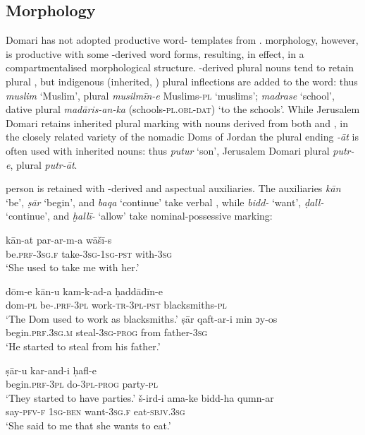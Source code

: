 \documentclass[output=paper]{langsci/langscibook}
\begin{document}
\subsection{Morphology}

Domari has not adopted productive word- templates from .   morphology, however, is productive with some -derived word forms, resulting, in effect, in a compartmentalised morphological structure. -derived plural nouns tend to retain  plural , but indigenous (inherited, ) plural inflections are added to the word: thus \textit{muslim} ‘Muslim’, plural \textit{musilmīn-e} Muslims-\textsc{pl} \textsc{‘}muslims’; \textit{madrase} ‘school’, dative plural \textit{madāris-an-ka}  (schools-\textsc{pl.obl-dat}) ‘to the schools’. While Jerusalem Domari retains inherited plural marking with nouns derived from both  and , in the closely related variety of the nomadic Doms of Jordan the  plural ending \textit{-āt} is often used with inherited nouns: thus \textit{putur} ‘son’, Jerusalem Domari plural \textit{putr-e},  plural \textit{putr-āt}.

 person   is retained with -derived  and aspectual auxiliaries. The auxiliaries \textit{kān} ‘be’, \textit{ṣār} ‘begin’, and \textit{baqa} ‘continue’ take  verbal , while \textit{bidd-} ‘want’, \textit{ḍall-} ‘continue’, and \textit{ḫallī-} ‘allow’ take  nominal-possessive marking:

\ea
\ea
\gll kān-at           par-ar-m-a        wāšī-s  \\
     be.\textsc{prf-3sg.f}   take-\textsc{3sg-1sg-pst}  with-\textsc{3sg}\\
\glt ‘She used to take me with her.’

\ex
\gll dōm-e kān-u kam-k-ad-a  {ḥ}addādīn-e\\
     dom-\textsc{pl} be-\textsc{.prf-3pl} work-\textsc{tr-3pl-pst} blacksmiths-\textsc{pl}\\
\glt ‘The Dom used to work as blacksmiths.’
\z
\ex
\ea
\gll ṣār  qaft-ar-i  min  {ɔ}y-os\\
     begin.\textsc{prf.3sg.m} steal-\textsc{3sg-prog} from father-\textsc{3sg}\\
\glt ‘He started to steal from his father.’

\ex
\gll ṣār-u  kar-and-i  ḥafl-e\\
     begin.\textsc{prf-3pl} do-\textsc{3pl}-\textsc{prog}  party-\textsc{pl}\\
\glt ‘They started to have parties.’
\z
\ex
\ea
\gll š-ird-i  ama-ke bidd-ha qumn-ar\\
     say-\textsc{pfv-f} \textsc{1sg-ben} want-\textsc{3sg.f} eat-\textsc{sbjv.3sg}\\
\glt ‘She said to me that she wants to eat.’
\end{document}
